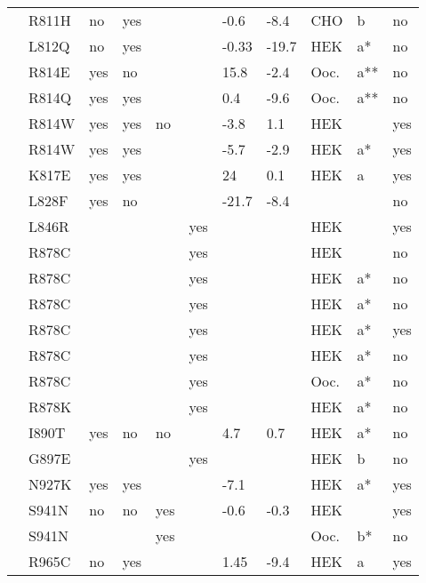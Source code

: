 \begin{tiny}
\begin{longtable}{p{4cm}|l|llll|ll|lll}
\citet{Calloe2013MutationDB} & R811H & no & yes &  &  & -0.6 & -8.4 & CHO & b & no \\
\citet{Wang2015MutationDB} & L812Q & no & yes &  &  & -0.33 & -19.7 & HEK & a* & no \\
\citet{Chen1996MutationDB} & R814E & yes & no &  &  & 15.8 & -2.4 & Ooc. & a** & no \\
\citet{Chen1996MutationDB} & R814Q & yes & yes &  &  & 0.4 & -9.6 & Ooc. & a** & no \\
\citet{Beckermann2014MutationDB} & R814W & yes & yes & no &  & -3.8 & 1.1 & HEK &  & yes \\
\citet{Nguyen2008MutationDB} & R814W & yes & yes &  &  & -5.7 & -2.9 & HEK & a* & yes \\
\citet{Kinoshita2016MutationDB} & K817E & yes & yes &  &  & 24 & 0.1 & HEK & a & yes \\
\citet{David2012MutationDB} & L828F & yes & no &  &  & -21.7 & -8.4 &  &  & no \\
\citet{Watanabe2011aMutationDB} & L846R &  &  &  & yes &  &  & HEK &  & yes \\
\citet{Clatot2012MutationDB} & R878C &  &  &  & yes &  &  & HEK &  & no \\
\citet{Gui2010aMutationDB} & R878C &  &  &  & yes &  &  & HEK & a* & no \\
\citet{Gui2010bMutationDB} & R878C &  &  &  & yes &  &  & HEK & a* & no \\
\citet{Zhang2008MutationDB} & R878C &  &  &  & yes &  &  & HEK & a* & yes \\
\citet{Zhang2008MutationDB} & R878C &  &  &  & yes &  &  & HEK & a* & no \\
\citet{Zhang2008MutationDB} & R878C &  &  &  & yes &  &  & Ooc. & a* & no \\
\citet{Zhang2008MutationDB} & R878K &  &  &  & yes &  &  & HEK & a* & no \\
\citet{Tarradas2013MutationDB} & I890T & yes & no & no &  & 4.7 & 0.7 & HEK & a* & no \\
\citet{Kapplinger2015MutationDB} & G897E &  &  &  & yes &  &  & HEK & b & no \\
\citet{Wang2007bMutationDB} & N927K & yes & yes &  &  & -7.1 &  & HEK & a* & yes \\
\citet{Ruan2007MutationDB} & S941N & no & no & yes &  & -0.6 & -0.3 & HEK &  & yes \\
\citet{Schwartz2000MutationDB} & S941N &  &  & yes &  &  &  & Ooc. & b* & no \\
\citet{Hsueh2009MutationDB} & R965C & no & yes &  &  & 1.45 & -9.4 & HEK & a & yes \\

\end{longtable}
\end{tiny}
